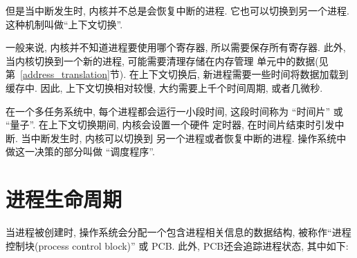 \documentclass[12pt]{book}
\begin{document}
{%
但是当中断发生时, 内核并不总是会恢复中断的进程. 
它也可以切换到另一个进程. 这种机制叫做``上下文切换''.

一般来说, 内核并不知道进程要使用哪个寄存器, 所以需要保存所有寄存器. 
此外, 当内核切换到一个新的进程, 可能需要清理存储在内存管理
单元中的数据(见第~\ref{address_translation}节). 
在上下文切换后, 新进程需要一些时间将数据加载到缓存中. 
因此, 上下文切换相对较慢, 大约需要上千个时间周期, 或者几微秒. 

在一个多任务系统中, 每个进程都会运行一小段时间, 这段时间称为
``时间片'' 或 ``量子''. 在上下文切换期间, 内核会设置一个硬件
定时器, 在时间片结束时引发中断. 当中断发生时, 内核可以切换到
另一个进程或者恢复中断的进程. 操作系统中做这一决策的部分叫做
``调度程序''.


\section{进程生命周期}

当进程被创建时, 操作系统会分配一个包含进程相关信息的数据结构, 
被称作``进程控制块(process control block)'' 或 PCB. 
此外, PCB还会追踪进程状态, 其中如下:

}
\end{document}
